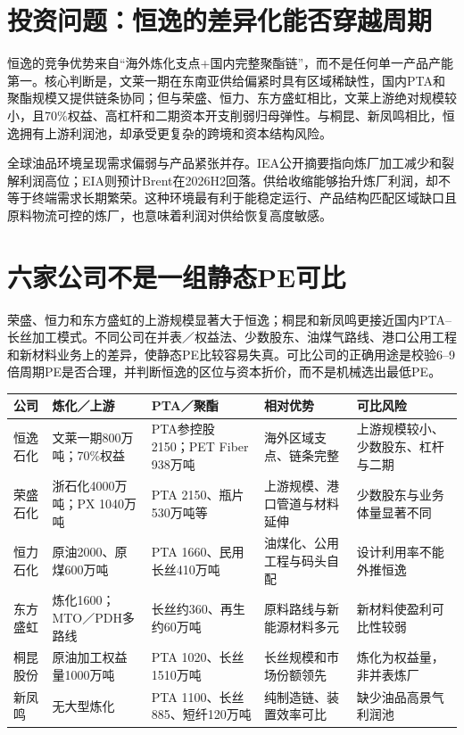 \section{投资问题：恒逸的差异化能否穿越周期}

恒逸的竞争优势来自“海外炼化支点+国内完整聚酯链”，而不是任何单一产品产能第一。核心判断是，文莱一期在东南亚供给偏紧时具有区域稀缺性，国内PTA和聚酯规模又提供链条协同；但与荣盛、恒力、东方盛虹相比，文莱上游绝对规模较小，且70\%权益、高杠杆和二期资本开支削弱归母弹性。与桐昆、新凤鸣相比，恒逸拥有上游利润池，却承受更复杂的跨境和资本结构风险。

全球油品环境呈现需求偏弱与产品紧张并存。IEA公开摘要指向炼厂加工减少和裂解利润高位；EIA则预计Brent在2026H2回落。供给收缩能够抬升炼厂利润，却不等于终端需求长期繁荣。这种环境最有利于能稳定运行、产品结构匹配区域缺口且原料物流可控的炼厂，也意味着利润对供给恢复高度敏感。

\section{六家公司不是一组静态PE可比}

荣盛、恒力和东方盛虹的上游规模显著大于恒逸；桐昆和新凤鸣更接近国内PTA--长丝加工模式。不同公司在并表／权益法、少数股东、油煤气路线、港口公用工程和新材料业务上的差异，使静态PE比较容易失真。可比公司的正确用途是校验6--9倍周期PE是否合理，并判断恒逸的区位与资本折价，而不是机械选出最低PE。

\begin{exhibitbox}[一体化竞争格局]
\scriptsize
\noindent\begin{tabularx}{\textwidth}{L{1.75cm}L{2.35cm}L{2.35cm}L{2.35cm}X}
\toprule
\textbf{公司} & \textbf{炼化／上游} & \textbf{PTA／聚酯} & \textbf{相对优势} & \textbf{可比风险} \\
\midrule
恒逸石化 & 文莱一期800万吨；70\%权益 & PTA参控股2150；PET Fiber 938万吨 & 海外区域支点、链条完整 & 上游规模较小、少数股东、杠杆与二期 \\
荣盛石化 & 浙石化4000万吨；PX 1040万吨 & PTA 2150、瓶片530万吨等 & 上游规模、港口管道与材料延伸 & 少数股东与业务体量显著不同 \\
恒力石化 & 原油2000、原煤600万吨 & PTA 1660、民用长丝410万吨 & 油煤化、公用工程与码头自配 & 设计利用率不能外推恒逸 \\
东方盛虹 & 炼化1600；MTO／PDH多路线 & 长丝约360、再生约60万吨 & 原料路线与新能源材料多元 & 新材料使盈利可比性较弱 \\
桐昆股份 & 原油加工权益量1000万吨 & PTA 1020、长丝1510万吨 & 长丝规模和市场份额领先 & 炼化为权益量，非并表炼厂 \\
新凤鸣 & 无大型炼化 & PTA 1100、长丝885、短纤120万吨 & 纯制造链、装置效率可比 & 缺少油品高景气利润池 \\
\bottomrule
\end{tabularx}
\end{exhibitbox}

